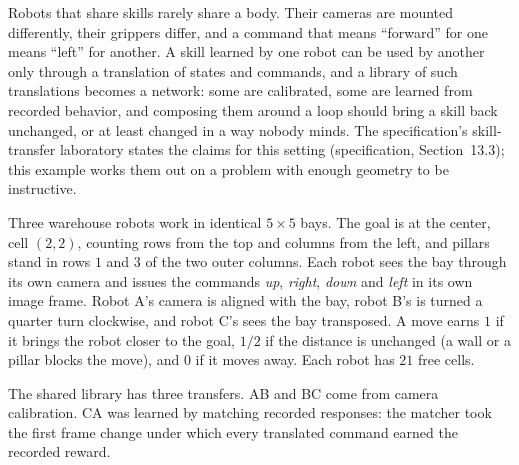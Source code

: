 \documentclass[11pt]{article}
\newcommand{\spec}[1]{specification, Section~#1}
\theoremstyle{definition}
\theoremstyle{plain}
\begin{document}
Robots that share skills rarely share a body. Their cameras are mounted differently, their
grippers differ, and a command that means ``forward'' for one means ``left'' for another. A skill
learned by one robot can be used by another only through a translation of states and commands,
and a library of such translations becomes a network: some are calibrated, some are learned from
recorded behavior, and composing them around a loop should bring a skill back unchanged, or at
least changed in a way nobody minds. The specification's skill-transfer laboratory states the
claims for this setting (\spec{13.3}); this example works them out on a problem with enough
geometry to be instructive.

Three warehouse robots work in identical $5\times5$ bays. The goal is at the center, cell $(2,2)$,
counting rows from the top and columns from the left, and pillars stand in rows $1$ and $3$ of the
two outer columns. Each robot sees the bay through its own camera and issues the commands
\emph{up}, \emph{right}, \emph{down} and \emph{left} in its own image frame. Robot A's camera is
aligned with the bay, robot B's is turned a quarter turn clockwise, and robot C's sees the bay
transposed. A move earns $1$ if it brings the robot closer to the goal, $1/2$ if the distance is
unchanged (a wall or a pillar blocks the move), and $0$ if it moves away. Each robot has $21$ free
cells.

The shared library has three transfers. AB and BC come from camera calibration. CA was learned by
matching recorded responses: the matcher took the first frame change under which every translated
command earned the recorded reward.
\end{document}
